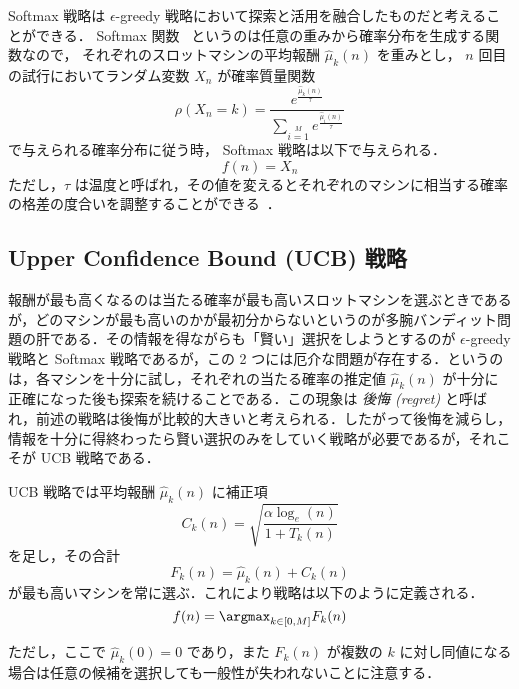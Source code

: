 \documentclass{jsarticle}
\def\hmukn{\hat{\mu}_k (n)}
\begin{document}
Softmax 戦略は $\epsilon$-greedy 戦略において探索と活用を融合したものだと考えることができる． Softmax 関数~\cite{wiki:softmax} というのは任意の重みから確率分布を生成する関数なので， それぞれのスロットマシンの平均報酬 $\hmukn$ を重みとし， $n$ 回目の試行においてランダム変数 $X_n$ が確率質量関数
\begin{equation}
  \rho(X_n = k) = \frac{e^{\frac{\hmukn}{\tau}}}{\sum\limits_{i = 1}\limits^{M}e^{\frac{\hat{\mu}_i(n)}{\tau}}}
\end{equation}
で与えられる確率分布に従う時， Softmax 戦略は以下で与えられる．
\begin{equation}
  f(n) = X_n
\end{equation}
ただし，$\tau$ は温度と呼ばれ，その値を変えるとそれぞれのマシンに相当する確率の格差の度合いを調整することができる~\cite{so:softmax_temperature}．

\subsection{Upper Confidence Bound (UCB) 戦略}

報酬が最も高くなるのは当たる確率が最も高いスロットマシンを選ぶときであるが，どのマシンが最も高いのかが最初分からないというのが多腕バンディット問題の肝である．その情報を得ながらも「賢い」選択をしようとするのが $\epsilon$-greedy 戦略と Softmax 戦略であるが，この 2  つには厄介な問題が存在する．というのは，各マシンを十分に試し，それぞれの当たる確率の推定値 $\hmukn$ が十分に正確になった後も探索を続けることである．この現象は {\em 後悔 (regret) \/} と呼ばれ，前述の戦略は後悔が比較的大きいと考えられる．したがって後悔を減らし，情報を十分に得終わったら賢い選択のみをしていく戦略が必要であるが，それこそが UCB 戦略である．

UCB 戦略では平均報酬 $\hmukn$ に補正項
\begin{equation}
  C_k(n) = \sqrt{\frac{\alpha \log_e(n)}{1 + T_k(n)}}
\end{equation}
を足し，その合計
\begin{equation}
  F_k(n) = \hmukn + C_k(n)
\end{equation}
が最も高いマシンを常に選ぶ．これにより戦略は以下のように定義される．
\begin{equation}
  f(n) = \argmax_{k \in [0, M]} F_k(n)
\end{equation}

ただし，ここで $\hat{\mu}_k(0) = 0$ であり，また $F_k(n)$ が複数の $k$ に対し同値になる場合は任意の候補を選択しても一般性が失われないことに注意する．
\end{document}
